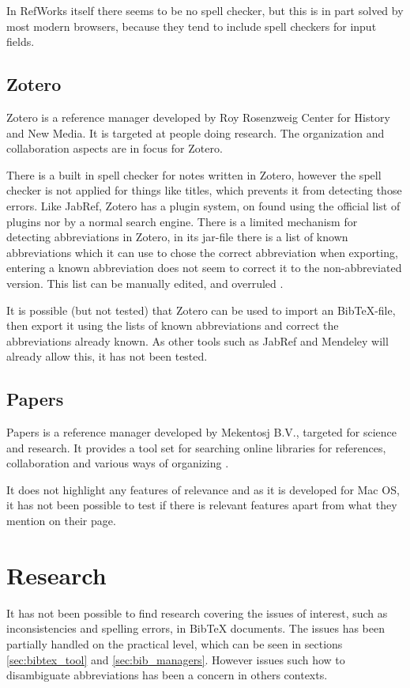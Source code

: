In RefWorks itself there seems to be no spell checker, but this is in
part solved by most modern browsers, because they tend to include
spell checkers for input fields.

\subsection{Zotero}
Zotero is a reference manager developed by Roy Rosenzweig Center for
History and New Media.  It is targeted at people doing research.  The
organization and collaboration aspects are in focus for
Zotero\cite{zotero_features}.

There is a built in spell checker for notes written in Zotero, however
the spell checker is not applied for things like titles, which
prevents it from detecting those errors.  Like JabRef, Zotero has a
plugin system, on found using the official list of plugins
\cite{zotero_plugins} nor by a normal search engine. There is a
limited mechanism for detecting abbreviations in Zotero, in its
jar-file there is a list of known abbreviations which it can use to
chose the correct abbreviation when exporting, entering a known
abbreviation does not seem to correct it to the non-abbreviated
version.  This list can be manually edited, and overruled
\cite{zotero_abbreviations}.

It is possible (but not tested) that Zotero can be used to import an
Bib{\TeX}-file, then export it using the lists of known abbreviations
and correct the abbreviations already known.  As other tools such as
JabRef and Mendeley will already allow this, it has not been tested.

\subsection{Papers}
Papers is a reference manager developed by Mekentosj B.V., targeted
for science and research.  It provides a tool set for searching online
libraries for references, collaboration and various ways of
organizing \cite{papers_features}.

It does not highlight any features of relevance \cite{papers_features}
and as it is developed for Mac OS, it has not been possible to test if
there is relevant features apart from what they mention on their page.

\section{Research }
It has not been possible to find research covering the issues of
interest, such as inconsistencies and spelling errors, in Bib{\TeX}
documents.  The issues has been partially handled on the practical
level, which can be seen in sections \ref{sec:bibtex_tool} and
\ref{sec:bib_managers}.  However issues such how to disambiguate
abbreviations has been a concern in others contexts.

